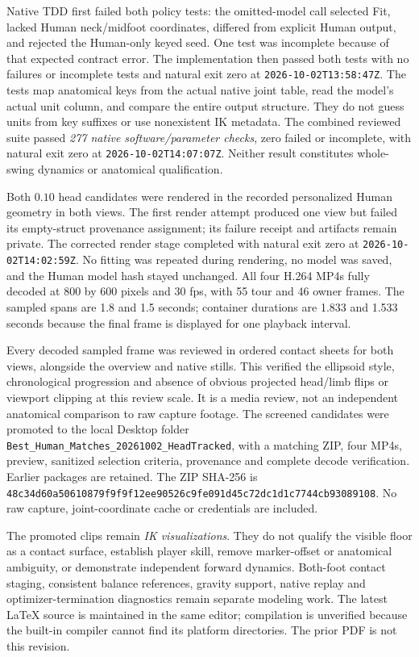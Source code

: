 \documentclass[11pt,a4paper]{article}
\begin{document}
Native TDD first failed both policy tests: the omitted-model call selected
Fit, lacked Human neck/midfoot coordinates, differed from explicit Human
output, and rejected the Human-only keyed seed. One test was incomplete
because of that expected contract error. The implementation then passed
both tests with no failures or incomplete tests and natural exit zero at
\texttt{2026-10-02T13:58:47Z}. The tests map anatomical keys from the actual
native joint table, read the model's actual unit column, and compare the
entire output structure. They do not guess units from key suffixes or use
nonexistent IK metadata. The combined reviewed suite passed
\emph{277 native software/parameter checks}, zero failed or incomplete,
with natural exit zero at \texttt{2026-10-02T14:07:07Z}. Neither result
constitutes whole-swing dynamics or anatomical qualification.

Both $0.10$ head candidates were rendered in the recorded personalized
Human geometry in both views. The first render attempt produced one view
but failed its empty-struct provenance assignment; its failure receipt and
artifacts remain private. The corrected render stage completed with natural
exit zero at \texttt{2026-10-02T14:02:59Z}. No fitting was repeated during
rendering, no model was saved, and the Human model hash stayed unchanged.
All four H.264 MP4s fully decoded at 800 by 600 pixels and 30 fps, with
55 tour and 46 owner frames. The sampled spans are 1.8 and 1.5 seconds;
container durations are 1.833 and 1.533 seconds because the final frame is
displayed for one playback interval.

Every decoded sampled frame was reviewed in ordered contact sheets for
both views, alongside the overview and native stills. This verified the
ellipsoid style, chronological progression and absence of obvious projected
head/limb flips or viewport clipping at this review scale. It is a media
review, not an independent anatomical comparison to raw capture footage.
The screened candidates were promoted to the local Desktop folder
\texttt{Best\_Human\_Matches\_20261002\_HeadTracked}, with a matching ZIP,
four MP4s, preview, sanitized selection criteria, provenance and complete
decode verification. Earlier packages are retained. The ZIP SHA-256 is
\texttt{48c34d60a50610879f9f9f12ee90526c9fe091d45c72dc1d1c7744cb93089108}.
No raw capture, joint-coordinate cache or credentials are included.

The promoted clips remain \emph{IK visualizations}. They do not qualify
the visible floor as a contact surface, establish player skill, remove
marker-offset or anatomical ambiguity, or demonstrate independent forward
dynamics. Both-foot contact staging, consistent balance references,
gravity support, native replay and optimizer-termination diagnostics remain
separate modeling work. The latest LaTeX source is maintained in the same
editor; compilation is unverified because the built-in compiler cannot
find its platform directories. The prior PDF is not this revision.
\end{document}
